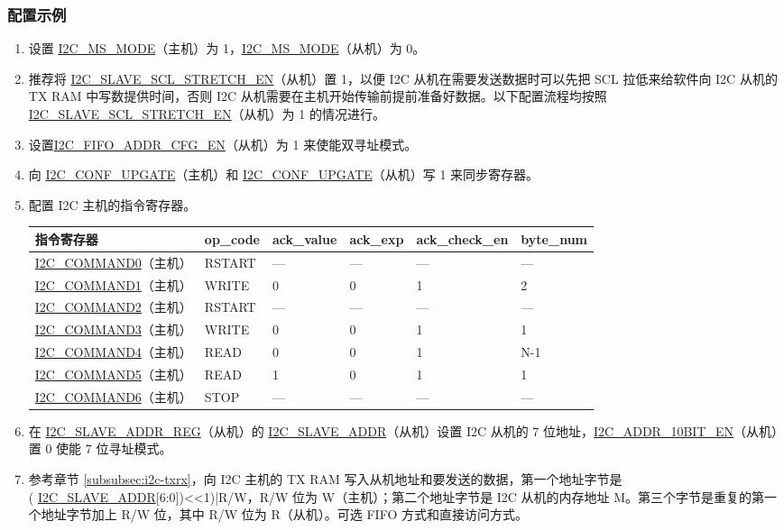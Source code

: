 \documentclass[main\_\_CN.tex]{subfiles}
\begin{document}
\subsubsection{配置示例}
\begin{enumerate}
\item 设置 \hyperref[fielddesc:I2CMSMODE]{I2C\_MS\_MODE}（主机）为 1，\hyperref[fielddesc:I2CMSMODE]{I2C\_MS\_MODE}（从机）为 0。
\item 推荐将 \hyperref[fielddesc:I2CSLAVESCLSTRETCHEN]{I2C\_SLAVE\_SCL\_STRETCH\_EN}（从机）置 1，以便 I2C 从机在需要发送数据时可以先把 SCL 拉低来给软件向 I2C 从机的 TX RAM 中写数提供时间，否则 I2C 从机需要在主机开始传输前提前准备好数据。以下配置流程均按照\hyperref[fielddesc:I2CSLAVESCLSTRETCHEN]{I2C\_SLAVE\_SCL\_STRETCH\_EN}（从机）为 1 的情况进行。
\item 设置\hyperref[fielddesc:I2CFIFOADDRCFGEN]{I2C\_FIFO\_ADDR\_CFG\_EN}（从机）为 1 来使能双寻址模式。
\item 向 \hyperref[fielddesc:I2CCONFUPGATE]{I2C\_CONF\_UPGATE}（主机）和 \hyperref[fielddesc:I2CCONFUPGATE]{I2C\_CONF\_UPGATE}（从机）写 1 来同步寄存器。
\item 配置 I2C 主机的指令寄存器。
\begin{longtable}{ | p{4cm} | p{2cm} | p{2cm} | p{2cm} |p{2cm} | p{2cm} |}
\hline\rowcolor{lightgray}
指令寄存器& op\_code & ack\_value&ack\_exp&ack\_check\_en&byte\_num  \\ \hline
\hyperref[fielddesc:I2CCOMMAND0]{I2C\_COMMAND0}（主机）& RSTART& ---&---&---&---  \\ \hline
\hyperref[fielddesc:I2CCOMMAND1]{I2C\_COMMAND1}（主机）& WRITE& 0&0&1&2  \\ \hline
\hyperref[fielddesc:I2CCOMMAND2]{I2C\_COMMAND2}（主机）& RSTART& ---&---&---&---  \\ \hline
\hyperref[fielddesc:I2CCOMMAND3]{I2C\_COMMAND3}（主机）& WRITE& 0&0&1&1  \\ \hline
\hyperref[fielddesc:I2CCOMMAND4]{I2C\_COMMAND4}（主机）& READ& 0&0&1&N-1  \\ \hline
\hyperref[fielddesc:I2CCOMMAND5]{I2C\_COMMAND5}（主机）& READ& 1&0&1&1  \\ \hline
\hyperref[fielddesc:I2CCOMMAND6]{I2C\_COMMAND6}（主机）& STOP& ---&---&---&---  \\ \hline
\end{longtable}

\item 在 \hyperref[regdesc:I2CSLAVEADDRREG]{I2C\_SLAVE\_ADDR\_REG}（从机）的 \hyperref[fielddesc:I2CSLAVEADDR]{I2C\_SLAVE\_ADDR}（从机）设置 I2C 从机的 7 位地址，\hyperref[fielddesc:I2CADDR10BITEN]{I2C\_ADDR\_10BIT\_EN}（从机）置 0 使能 7 位寻址模式。
\item 参考章节 \ref{subsubsec:i2c-txrx}，向 I2C 主机的 TX RAM 写入从机地址和要发送的数据，第一个地址字节是 \\( \hyperref[fielddesc:I2CSLAVEADDR]{I2C\_SLAVE\_ADDR}[6:0])<<1)|R/W，R/W 位为 W（主机）；第二个地址字节是 I2C 从机的内存地址 M。第三个字节是重复的第一个地址字节加上 R/W 位，其中 R/W 位为 R（从机）。可选 FIFO 方式和直接访问方式。


\end{enumerate}
\end{document}
